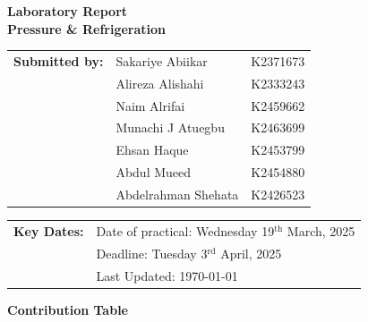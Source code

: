 \documentclass{article}
\begin{document}
	
	\vspace*{\fill}
	\begin{center}
		\textbf{\Huge Laboratory Report}\\[10pt]
		\LARGE \textbf{Pressure \& Refrigeration}
	\end{center}
	\vspace*{\fill}
	
	\Large    
	\begin{tabular}{@{}l l l@{}}
		\textbf{Submitted by:} & Sakariye Abiikar & K2371673 \\
		& Alireza Alishahi & K2333243 \\
		& Naim Alrifai & K2459662 \\
		& Munachi J Atuegbu & K2463699 \\
		& Ehsan Haque & K2453799 \\
		& Abdul Mueed & K2454880 \\   
		& Abdelrahman Shehata & K2426523 \\   
	\end{tabular}
	
	\vspace*{\fill}
	
	\begin{tabular}{@{}l l@{}}
		\textbf{Key Dates:} & Date of practical: Wednesday 19$^{\text{th}}$ March, 2025 \\
		& Deadline: Tuesday 3$^{\text{rd}}$ April, 2025 \\
		& Last Updated: \today\, \currenttime\\
	\end{tabular}
	\vspace*{\fill}
	
	\large
	\newpage\noindent\vspace{2em}
	\begin{center}
		\LARGE \textbf{Contribution Table}\\[3em]
	\end{center}
	
	
	
\end{document}

